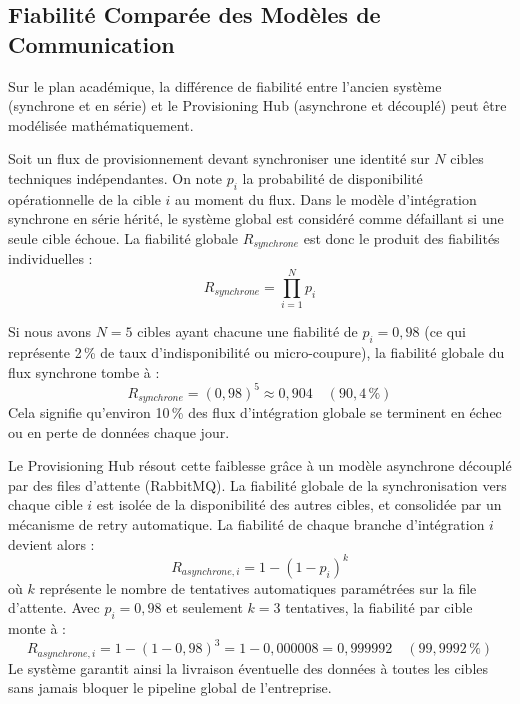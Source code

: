 \subsection{Fiabilité Comparée des Modèles de Communication}
Sur le plan académique, la différence de fiabilité entre l'ancien système (synchrone et en série) et le Provisioning Hub (asynchrone et découplé) peut être modélisée mathématiquement.

Soit un flux de provisionnement devant synchroniser une identité sur $N$ cibles techniques indépendantes. On note $p_i$ la probabilité de disponibilité opérationnelle de la cible $i$ au moment du flux.
Dans le modèle d'intégration synchrone en série hérité, le système global est considéré comme défaillant si une seule cible échoue. La fiabilité globale $R_{synchrone}$ est donc le produit des fiabilités individuelles :
\begin{equation}
R_{synchrone} = \prod_{i=1}^{N} p_i
\end{equation}

Si nous avons $N = 5$ cibles ayant chacune une fiabilité de $p_i = 0,98$ (ce qui représente 2\,\% de taux d'indisponibilité ou micro-coupure), la fiabilité globale du flux synchrone tombe à :
\begin{equation}
R_{synchrone} = (0,98)^5 \approx 0,904 \quad (90,4\,\%)
\end{equation}
Cela signifie qu'environ 10\,\% des flux d'intégration globale se terminent en échec ou en perte de données chaque jour.

Le Provisioning Hub résout cette faiblesse grâce à un modèle asynchrone découplé par des files d'attente (RabbitMQ). La fiabilité globale de la synchronisation vers chaque cible $i$ est isolée de la disponibilité des autres cibles, et consolidée par un mécanisme de retry automatique. La fiabilité de chaque branche d'intégration $i$ devient alors :
\begin{equation}
R_{asynchrone, i} = 1 - (1 - p_i)^k
\end{equation}
où $k$ représente le nombre de tentatives automatiques paramétrées sur la file d'attente. Avec $p_i = 0,98$ et seulement $k = 3$ tentatives, la fiabilité par cible monte à :
\begin{equation}
R_{asynchrone, i} = 1 - (1 - 0,98)^3 = 1 - 0,000008 = 0,999992 \quad (99,9992\,\%)
\end{equation}
Le système garantit ainsi la livraison éventuelle des données à toutes les cibles sans jamais bloquer le pipeline global de l'entreprise.

